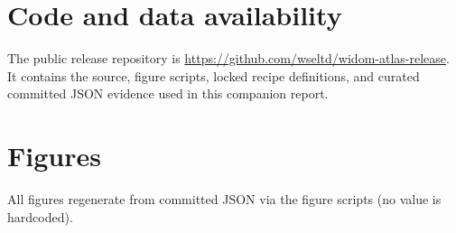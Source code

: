 \documentclass[11pt,a4paper]{article}
\begin{document}


\section*{Code and data availability}

The public release repository is \url{https://github.com/wseltd/widom-atlas-release}. It contains the source, figure scripts, locked recipe definitions, and curated committed JSON evidence used in this companion report.

\FloatBarrier
\clearpage
\appendix
\section{Figures}
All figures regenerate from committed JSON via the figure scripts (no value is hardcoded).
\end{document}
